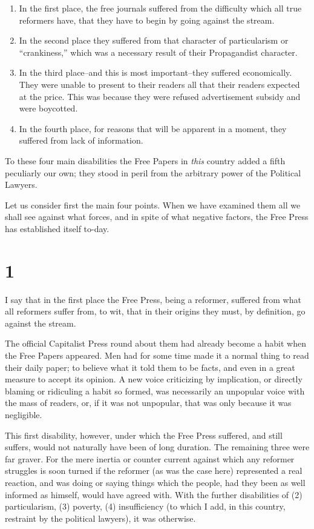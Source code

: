 \documentclass{book}
\begin{document}
\begin{enumerate}
\item In the first place, the free journals suffered from the difficulty which all true reformers have, that they have to begin by going against the stream.


\item In the second place they suffered from that character of particularism or “crankiness,” which was a necessary result of their Propagandist character.


\item In the third place–and this is most important–they suffered economically. They were unable to present to their readers all that their readers expected at the price. This was because they were refused advertisement subsidy and were boycotted.


\item In the fourth place, for reasons that will be apparent in a moment, they suffered from lack of information.



\end{enumerate}
To these four main disabilities the Free Papers in \emph{this} country added a fifth peculiarly our own; they stood in peril from the arbitrary power of the Political Lawyers.

Let us consider first the main four points. When we have examined them all we shall see against what forces, and in spite of what negative factors, the Free Press has established itself to-day.

\section*{1}
I say that in the first place the Free Press, being a reformer, suffered from what all reformers suffer from, to wit, that in their origins they must, by definition, go against the stream.

The official Capitalist Press round about them had already become a habit when the Free Papers appeared. Men had for some time made it a normal thing to read their daily paper; to believe what it told them to be facts, and even in a great measure to accept its opinion. A new voice criticizing by implication, or directly blaming or ridiculing a habit so formed, was necessarily an unpopular voice with the mass of readers, or, if it was not unpopular, that was only because it was negligible.

This first disability, however, under which the Free Press suffered, and still suffers, would not naturally have been of long duration. The remaining three were far graver. For the mere inertia or counter current against which any reformer struggles is soon turned if the reformer (as was the case here) represented a real reaction, and was doing or saying things which the people, had they been as well informed as himself, would have agreed with. With the further disabilities of (2) particularism, (3) poverty, (4) insufficiency (to which I add, in this country, restraint by the political lawyers), it was otherwise.
\end{document}

